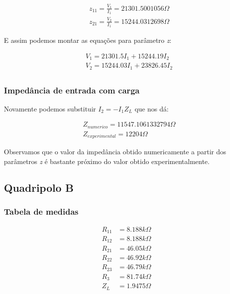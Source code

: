 \documentclass[12pt,twoside, a4paper, twocolumn]{article}
\begin{document}
\begin{equation}
    \begin{aligned}
         & z_{11} = \frac{V_1}{I_1} = 21301.5001056 \varOmega \\
         & z_{21} = \frac{V_2}{I_1} = 15244.0312698 \varOmega
    \end{aligned}
\end{equation}


E assim podemos montar as equações para parâmetro \emph{z}:


\begin{equation}
    \begin{aligned}
         & V_1 = 21301.5 I_1 + 15244.19 I_2  \\
         & V_2 = 15244.03 I_1 + 23826.45 I_2 \\
    \end{aligned}
\end{equation}


\subsubsection{Impedância de entrada com carga}


Novamente podemos substituir $I_2 = -I_1 Z_L$ que nos dá:


\begin{equation}
    \begin{aligned}
         & Z_{numerico} = 11547.1061332794 \varOmega \\
         & Z_{experimental} = 12204 \varOmega
    \end{aligned}
\end{equation}


Observamos que o valor da impedância obtido numericamente a partir dos parâmetros \emph{z} é bastante próximo do valor obtido experimentalmente.




\subsection{Quadripolo B}


\subsubsection{Tabela de medidas}
\begin{equation}
    \begin{aligned}
        R_{11} & = 8.188k \varOmega \\
        R_{12} & = 8.188k \varOmega \\
        R_{21} & = 46.05k \varOmega \\
        R_{22} & = 46.92k \varOmega \\
        R_{23} & = 46.79k \varOmega \\
        R_{3}  & = 81.74k \varOmega \\
        Z_L    & = 1.9475 \varOmega
    \end{aligned}
\end{equation}
\end{document}
